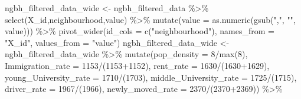 \documentclass[
]{article}
\newenvironment{Shaded}{\begin{snugshade}}{\end{snugshade}}
\newcommand{\AttributeTok}[1]{\textcolor[rgb]{0.77,0.63,0.00}{#1}}
\newcommand{\FunctionTok}[1]{\textcolor[rgb]{0.00,0.00,0.00}{#1}}
\newcommand{\NormalTok}[1]{#1}
\newcommand{\OtherTok}[1]{\textcolor[rgb]{0.56,0.35,0.01}{#1}}
\newcommand{\SpecialCharTok}[1]{\textcolor[rgb]{0.00,0.00,0.00}{#1}}
\newcommand{\StringTok}[1]{\textcolor[rgb]{0.31,0.60,0.02}{#1}}
\begin{document}
\begin{Shaded}
\begin{Highlighting}[]
\NormalTok{ngbh\_filtered\_data\_wide }\OtherTok{\textless{}{-}}\NormalTok{ ngbh\_filtered\_data }\SpecialCharTok{\%\textgreater{}\%} 
  \FunctionTok{select}\NormalTok{(X\_id,neighbourhood,value) }\SpecialCharTok{\%\textgreater{}\%} 
  \FunctionTok{mutate}\NormalTok{(}\AttributeTok{value =} \FunctionTok{as.numeric}\NormalTok{(}\FunctionTok{gsub}\NormalTok{(}\StringTok{","}\NormalTok{, }\StringTok{""}\NormalTok{, value))) }\SpecialCharTok{\%\textgreater{}\%} 
  \FunctionTok{pivot\_wider}\NormalTok{(}\AttributeTok{id\_cols =} \FunctionTok{c}\NormalTok{(}\StringTok{"neighbourhood"}\NormalTok{),}
              \AttributeTok{names\_from =} \StringTok{"X\_id"}\NormalTok{,}
              \AttributeTok{values\_from =} \StringTok{"value"}\NormalTok{) }
\NormalTok{ngbh\_filtered\_data\_wide }\OtherTok{\textless{}{-}}\NormalTok{ ngbh\_filtered\_data\_wide }\SpecialCharTok{\%\textgreater{}\%} 
  \FunctionTok{mutate}\NormalTok{(}\AttributeTok{pop\_density =} \StringTok{\textasciigrave{}}\AttributeTok{8}\StringTok{\textasciigrave{}}\SpecialCharTok{/}\FunctionTok{max}\NormalTok{(}\StringTok{\textasciigrave{}}\AttributeTok{8}\StringTok{\textasciigrave{}}\NormalTok{),}
    \AttributeTok{Immigration\_rate =} \StringTok{\textasciigrave{}}\AttributeTok{1153}\StringTok{\textasciigrave{}}\SpecialCharTok{/}\NormalTok{(}\StringTok{\textasciigrave{}}\AttributeTok{1153}\StringTok{\textasciigrave{}}\SpecialCharTok{+}\StringTok{\textasciigrave{}}\AttributeTok{1152}\StringTok{\textasciigrave{}}\NormalTok{),}
         \AttributeTok{rent\_rate =} \StringTok{\textasciigrave{}}\AttributeTok{1630}\StringTok{\textasciigrave{}}\SpecialCharTok{/}\NormalTok{(}\StringTok{\textasciigrave{}}\AttributeTok{1630}\StringTok{\textasciigrave{}}\SpecialCharTok{+}\StringTok{\textasciigrave{}}\AttributeTok{1629}\StringTok{\textasciigrave{}}\NormalTok{),}
         \AttributeTok{young\_University\_rate =} \StringTok{\textasciigrave{}}\AttributeTok{1710}\StringTok{\textasciigrave{}}\SpecialCharTok{/}\NormalTok{(}\StringTok{\textasciigrave{}}\AttributeTok{1703}\StringTok{\textasciigrave{}}\NormalTok{),}
         \AttributeTok{middle\_University\_rate =} \StringTok{\textasciigrave{}}\AttributeTok{1725}\StringTok{\textasciigrave{}}\SpecialCharTok{/}\NormalTok{(}\StringTok{\textasciigrave{}}\AttributeTok{1715}\StringTok{\textasciigrave{}}\NormalTok{),}
         \AttributeTok{driver\_rate =} \StringTok{\textasciigrave{}}\AttributeTok{1967}\StringTok{\textasciigrave{}}\SpecialCharTok{/}\NormalTok{(}\StringTok{\textasciigrave{}}\AttributeTok{1966}\StringTok{\textasciigrave{}}\NormalTok{),}
         \AttributeTok{newly\_moved\_rate =} \StringTok{\textasciigrave{}}\AttributeTok{2370}\StringTok{\textasciigrave{}}\SpecialCharTok{/}\NormalTok{(}\StringTok{\textasciigrave{}}\AttributeTok{2370}\StringTok{\textasciigrave{}}\SpecialCharTok{+}\StringTok{\textasciigrave{}}\AttributeTok{2369}\StringTok{\textasciigrave{}}\NormalTok{)) }\SpecialCharTok{\%\textgreater{}\%} 

\end{Highlighting}
\end{Shaded}
\end{document}
